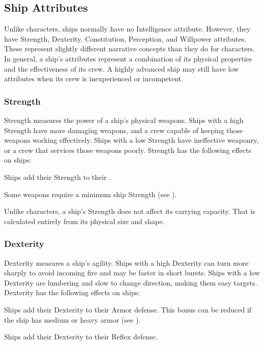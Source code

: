     \subsection{Ship Attributes}
        Unlike characters, ships normally have no Intelligence attribute.
        However, they have Strength, Dexterity, Constitution, Perception, and Willpower attributes.
        These represent slightly different narrative concepts than they do for characters.
        In general, a ship's attributes represent a combination of its physical properties and the effectiveness of its crew.
        A highly advanced ship may still have low attributes when its crew is inexperienced or incompetent.

        \subsubsection{Strength}
            Strength measures the power of a ship's physical weapons.
            Ships with a high Strength have more damaging weapons, and a crew capable of keeping those weapons working effectively.
            Ships with a low Strength have ineffective weaponry, or a crew that services those weapons poorly.
            Strength has the following effects on ships:
            \begin{raggeditemize}
                \item Ships add their Strength to their .
                \item Some weapons require a minimum ship Strength (see ).
            \end{raggeditemize}

            Unlike characters, a ship's Strength does not affect its carrying capacity.
            That is calculated entirely from its physical size and shape.

        \subsubsection{Dexterity}
            Dexterity measures a ship's agility.
            Ships with a high Dexterity can turn more sharply to avoid incoming fire and may be faster in short bursts.
            Ships with a low Dexterity are lumbering and slow to change direction, making them easy targets.
            Dexterity has the following effects on ships:
            \begin{raggeditemize}
                \item Ships add their Dexterity to their Armor defense.
                    This bonus can be reduced if the ship has medium or heavy armor (see ).
                \item Ships add their Dexterity to their Reflex defense.
            \end{raggeditemize}

